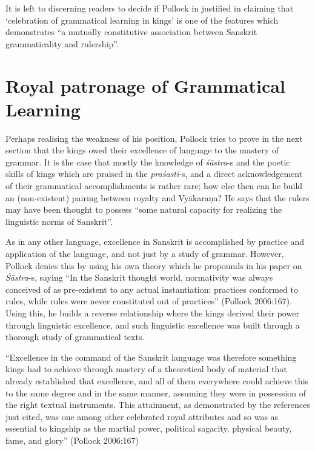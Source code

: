 It is left to discerning readers to decide if Pollock in justified in claiming that `celebration of grammatical learning in kings' is one of the features which demonstrates ``a mutually constitutive association between Sanskrit grammaticality and rulership''.

\section*{Royal patronage of Grammatical Learning}

Perhaps realising the weakness of his position, Pollock tries to prove in the next section  that the kings owed their excellence of language to the mastery of grammar. It is the case that mostly the knowledge of {\sl śāstra}-s and the poetic skills of kings which are praised in the {\sl praśasti}-s, and a direct acknowledgement of their grammatical accomplishments is rather rare; how else then can he build an (non-existent) pairing between royalty and Vyākaraṇa? He says that the rulers may have been thought to possess ``some natural capacity for realizing the linguistic norms of Sanskrit''.

As in any other language, excellence in Sanskrit is accomplished by practice and application of the language, and not just by a study of grammar. However, Pollock denies this by using his own theory which he propounds in his paper on {\sl Śāstra}-s, saying ``In the Sanskrit thought world, normativity was always conceived of as pre-existent to any actual instantiation: practices conformed to rules, while rules were never constituted out of practices'' (Pollock 2006:167). Using this, he builds a reverse relationship where the kings derived their power through linguistic excellence, and such linguistic excellence was built through a thorough study of grammatical texts.
\begin{myquote}
``Excellence in the command of the Sanskrit language was therefore something kings had to achieve through mastery of a theoretical body of material that already established that excellence, and all of them everywhere could achieve this to the same degree and in the same manner, assuming they were in possession of the right textual instruments. This attainment, as demonstrated by the references just cited, was one among other celebrated royal attributes and so was as essential to kingship as the martial power, political sagacity, physical beauty, fame, and glory''
\hfill (Pollock 2006:167)
\end{myquote}

